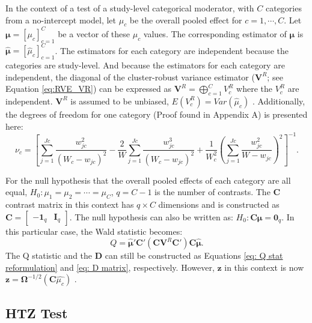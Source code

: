 In the context of a test of a study-level categorical moderator, with $C$ categories from a no-intercept model, let $\mu_c$ be the overall pooled effect for $c=1,\cdots, C$. Let $\bm{\mu} = \left[\mu_c\right]_{c=1}^C$ be a vector of these $\mu_c$ values. The corresponding estimator of $\bm{\mu}$ is $\bm{\hat{\mu}} = \left[\hat{\mu}_c\right]_{c=1}^C$. The estimators for each category are independent because the categories are study-level. And because the estimators for each category are independent, the diagonal of the cluster-robust variance estimator ($\bm{V}^R$; see Equation \ref{eq:RVE_VR}) can be expressed as $\bm{V}^R = \bigoplus_{c=1}^C V^R_c$ where the $V^R_c$ are independent.
$\bm{V}^R$ is assumed to be unbiased, $E(V_c^R) = Var(\hat{\mu}_c)$ \autocite{pustejovsky_wald_2025}. Additionally, the degrees of freedom for one category (Proof found in Appendix A) is presented here: 
\begin{equation}
   \nu_c = \left[ \sum_{j = 1} ^{Jc} \frac{w^2_{jc}}{ (W_c - w_{jc}) ^2} - \frac{2}{W} \sum_{j = 1} ^{Jc} \frac{w_{jc}^3}{(W_c - w_{jc})^2} + \frac{1}{W_c^2} \left(\sum_{j = 1} ^{Jc} \frac{w_{jc}^2}{W-w_{jc}} \right)^2 \right]^{-1}.
   \label{Eq: nu_c df}
\end{equation}

For the null hypothesis that the overall pooled effects of each category are all equal, $H_0: \mu_1 = \mu_2 = \cdots = \mu_C$, $q=C-1$ is the number of contrasts. The $\mathbf{C}$ contrast matrix in this context has $q \times C$ dimensions and is constructed as $\mathbf{C} = \begin{bmatrix}
    -\mathbf{1}_q & \mathbf{I}_q
\end{bmatrix}$. The null hypothesis can also be written as: $H_0:\mathbf{C}\bm{\mu} = \bm{0}_q$. In this particular case, the Wald statistic becomes:
\begin{equation}
    Q = \hat{\bm{\mu}}'\mathbf{C}'(\mathbf{C} \mathbf{V}^R \mathbf{C}') \mathbf{C}\hat{\bm{\mu}}.
    \nonumber
\end{equation}
The Q statistic and the $\mathbf{D}$ can still be constructed as Equations \ref{eq: Q stat reformulation} and \ref{eq: D matrix}, respectively. However, $\mathbf{z}$ in this context is now $\mathbf{z} = \mathbf{\Omega}^{-1/2}(\mathbf{C}\hat{\mu_c})$ \autocite{pustejovsky_wald_2025}.

\subsection{HTZ Test}

